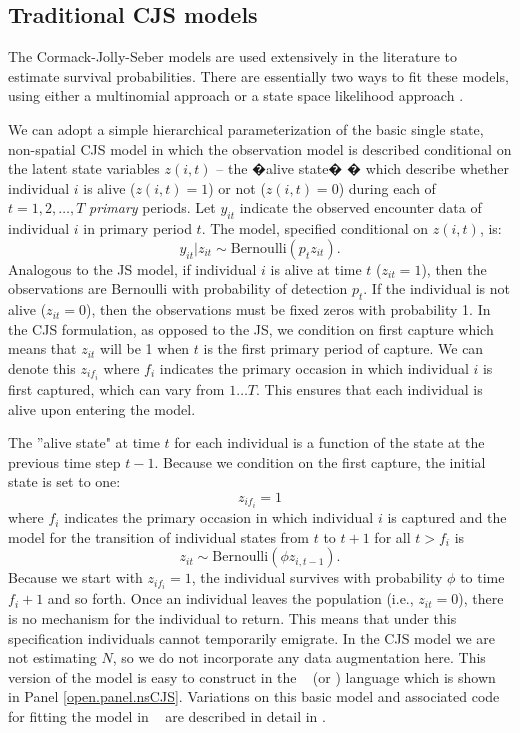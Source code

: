 \subsection{Traditional CJS models}

The Cormack-Jolly-Seber models are used extensively in the literature
to estimate
survival probabilities.  There are essentially two ways to
fit these models, using either a
multinomial approach \citep{lebreton_etal:1992} or a state space
likelihood approach \citep{gimenez:2007, royle:2008}.

We can adopt a simple hierarchical parameterization of the
basic single state, non-spatial CJS model in which the observation model is
described conditional on the latent state variables $z(i,t)$ -- the
�alive state� � which describe whether individual $i$ is
alive ($z(i,t)=1$) or not ($z(i,t)=0$) during each of $t=1,2,\ldots,T$
{\it primary} periods.
Let $y_{it}$ indicate the observed
encounter data of individual $i$ in primary period $t$. The
model, specified conditional on $z(i,t)$, is:
 \[
  y_{it}|z_{it} \sim
\mbox{Bernoulli}(p_{t}z_{it}).
\]
Analogous to the JS model, if individual $i$ is alive at time $t$ ($z_{it}=1$),
then the observations are Bernoulli with probability of detection $p_t$.
If the
individual is not alive ($z_{it}=0$), then the observations must be
fixed zeros with probability 1.
In the CJS formulation, as opposed to the JS, we condition on first capture which means that $z_{it}$ will
be 1 when $t$ is the first primary period of capture.   We can denote this $z_{i f_i}$
where $f_i$ indicates the primary occasion in which individual $i$ is first captured, which
can vary from $1 \dots T$.
This ensures that each individual is alive upon entering the model.

The ''alive state" at time $t$ for each individual is a
function of the state at the previous time step $t-1$.   Because
we condition on the first capture, the initial
state is set to one:
\[
 z_{i f_i} = 1
\]
where $f_i$ indicates the primary occasion in which individual $i$ is 
captured and the model for the transition of individual states from $t$ to $t+1$ for
all $t > f_i$ is
\[
 z_{i t} \sim \mbox{Bernoulli}( \phi z_{i,t-1}).
\]
Because we start with $z_{i f_i} = 1$, the individual survives with probability
$\phi$ to time $f_i + 1$ and so forth.  Once an individual leaves the
population (i.e., $z_{it} = 0$), there is no mechanism for the
individual to return.
This means that under this specification individuals cannot
temporarily emigrate.  In the CJS model we are not estimating $N$, so we do not incorporate
any data augmentation here.  This version of the model is easy to construct in the \bugs~ (or \jags)
language which is shown in Panel \ref{open.panel.nsCJS}.  Variations on this basic model and associated code for
fitting the model in \bugs~ are described in detail in \citet[][Chapts. 7-9]{kery_schaub:2011}.

